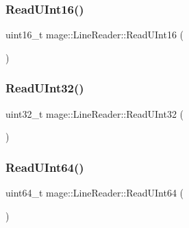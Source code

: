 \hypertarget{classmage_1_1_line_reader_a89f8d84257eae17db8c1e67d17f839f9}{}\label{classmage_1_1_line_reader_a89f8d84257eae17db8c1e67d17f839f9} 
\subsubsection{\texorpdfstring{Read\+U\+Int16()}{ReadUInt16()}}
{\footnotesize\ttfamily uint16\+\_\+t mage\+::\+Line\+Reader\+::\+Read\+U\+Int16 (\begin{DoxyParamCaption}{ }\end{DoxyParamCaption})\hspace{0.3cm}{\ttfamily [protected]}}

\hypertarget{classmage_1_1_line_reader_a82d14aede3b4ebff8cc54345dfba2c4b}{}\label{classmage_1_1_line_reader_a82d14aede3b4ebff8cc54345dfba2c4b} 
\subsubsection{\texorpdfstring{Read\+U\+Int32()}{ReadUInt32()}}
{\footnotesize\ttfamily uint32\+\_\+t mage\+::\+Line\+Reader\+::\+Read\+U\+Int32 (\begin{DoxyParamCaption}{ }\end{DoxyParamCaption})\hspace{0.3cm}{\ttfamily [protected]}}

\hypertarget{classmage_1_1_line_reader_ac05624eb7a786bfc1391b22095da1e71}{}\label{classmage_1_1_line_reader_ac05624eb7a786bfc1391b22095da1e71} 
\subsubsection{\texorpdfstring{Read\+U\+Int64()}{ReadUInt64()}}
{\footnotesize\ttfamily uint64\+\_\+t mage\+::\+Line\+Reader\+::\+Read\+U\+Int64 (\begin{DoxyParamCaption}{ }\end{DoxyParamCaption})\hspace{0.3cm}{\ttfamily [protected]}}

